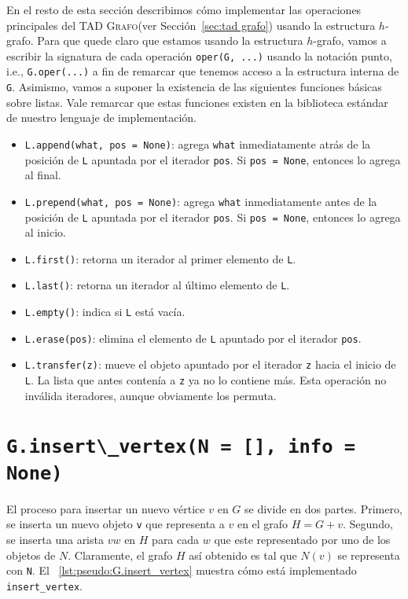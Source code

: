 \documentclass[%
    a4paper,%
    fontsize=12pt,%
    DIV=12,
    twoside,%
    openright,%
    titlepage=true,%
    headsepline,%
    toc=bibliography,%
    parskip=half,%
    cleardoublepage=empty,%
    headings=big,%
]{scrbook}
\makeatletter
\newcommand{\Grafo}{\textsc{Grafo}\xspace}
\newcommand{\Code}[2][]{\lstinline[basicstyle={\ttfamily},#1]@#2@}
\makeatother
\begin{document}
En el resto de esta sección describimos cómo implementar las operaciones principales del TAD \Grafo (ver Sección~\ref{sec:tad grafo}) usando la estructura $h$-grafo.  Para que quede claro que estamos usando la estructura $h$-grafo, vamos a escribir la signatura de cada operación \Code{oper(G, ...)} usando la notación punto, i.e., \Code{G.oper(...)} a fin de remarcar que tenemos acceso a la estructura interna de \Code{G}.  Asimismo, vamos a suponer la existencia de las siguientes funciones básicas sobre listas.  Vale remarcar que estas funciones existen en la biblioteca estándar de nuestro lenguaje de implementación.
\begin{itemize}
  \item \Code{L.append(what, pos = None)}: agrega \Code{what} inmediatamente atrás de la posición de \Code{L} apuntada por el iterador \Code{pos}.  Si \Code{pos = None}, entonces lo agrega al final.
  \item \Code{L.prepend(what, pos = None)}: agrega \Code{what} inmediatamente antes de la posición de \Code{L} apuntada por el iterador \Code{pos}.  Si \Code{pos = None}, entonces lo agrega al inicio.
  \item \Code{L.first()}: retorna un iterador al primer elemento de \Code{L}.
  \item \Code{L.last()}: retorna un iterador al último elemento de \Code{L}. 
  \item \Code{L.empty()}: indica si \Code{L} está vacía.
  \item \Code{L.erase(pos)}: elimina el elemento de \Code{L} apuntado por el iterador \Code{pos}.
  \item \Code{L.transfer(z)}: mueve el objeto apuntado por el iterador \Code{z} hacia el inicio de \Code{L}.  La lista que antes contenía a \Code{z} ya no lo contiene más.  Esta operación no inválida iteradores, aunque obviamente los permuta.
\end{itemize}

\section{\texorpdfstring{\Code{G.insert\_vertex(N = [], info = None)}}{G.insert\_vertex}}
\label{sec:hgraph:insert_vertex}


El proceso para insertar un nuevo vértice $v$ en $G$ se divide en dos partes.  Primero, se inserta un nuevo objeto \Code{v} que representa a $v$ en el grafo $H = G + v$.  Segundo, se inserta una arista $vw$ en $H$ para cada $w$ que este representado por uno de los objetos de $N$.  Claramente, el grafo $H$ así obtenido es tal que $N(v)$ se representa con \Code{N}.  El \lstlistingname~\ref{lst:pseudo:G.insert_vertex} muestra cómo está implementado \Code{insert_vertex}.
\end{document}

